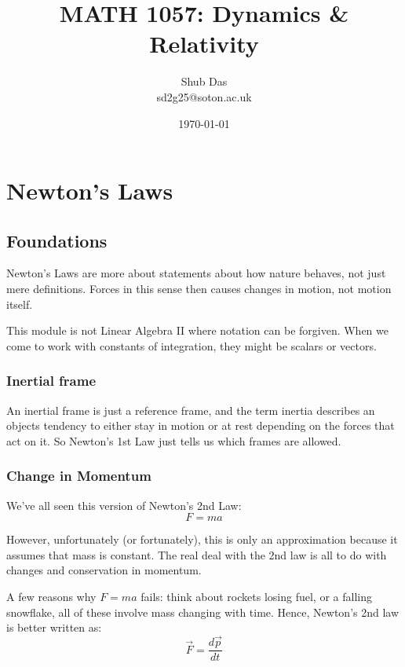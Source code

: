 \title{MATH 1057: Dynamics \& Relativity}
\author{Shub Das \\ sd2g25@soton.ac.uk}
\date{\today}

\maketitle

\tableofcontents 


\chapter{Newton's Laws}

\section{Foundations}

Newton's Laws are more about statements about how nature behaves, not just mere definitions. Forces in this sense then causes changes in motion, not motion itself. 

This module is not Linear Algebra II where notation can be forgiven. When we come to work with constants of integration, they might be scalars or vectors. 


\subsection{Inertial frame}

An inertial frame is just a reference frame, and the term inertia describes an objects tendency to either stay in motion or at rest depending on the forces that act on it. So Newton's 1st Law just tells us which frames are allowed. 

\subsection{Change in Momentum}

We've all seen this version of Newton's 2nd Law: 
$$
F = ma 
$$

However, unfortunately (or fortunately), this is only an approximation because it assumes that mass is constant. The real deal with the 2nd law is all to do with changes and conservation in momentum. 

A few reasons why $F=ma$ fails: think about rockets losing fuel, or a falling snowflake, all of these involve mass changing with time. Hence, Newton's 2nd law is better written as:
$$
\vec{F} = \frac{d \vec{p}}{dt}
$$

